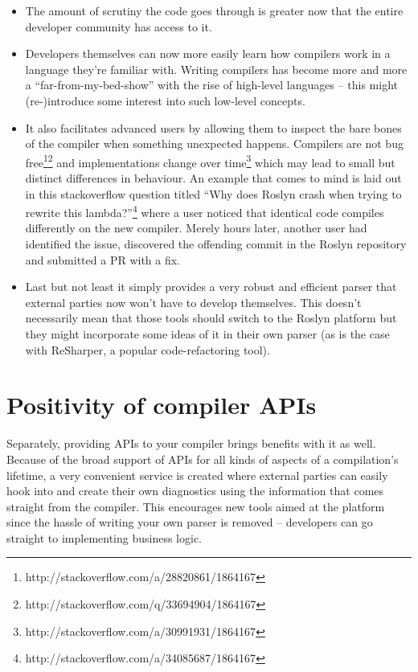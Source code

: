 \begin{itemize}
	\item The amount of scrutiny the code goes through is greater now that the entire developer community has access to it.
	
	\item Developers themselves can now more easily learn how compilers work in a language they’re familiar with. Writing compilers has become more and more a “far-from-my-bed-show” with the rise of high-level languages – this might (re-)introduce some interest into such low-level concepts.
	
	\item It also facilitates advanced users by allowing them to inspect the bare bones of the compiler when something unexpected happens. Compilers are not bug free\footnote{http://stackoverflow.com/a/28820861/1864167}\footnote{http://stackoverflow.com/q/33694904/1864167} and implementations change over time\footnote{http://stackoverflow.com/a/30991931/1864167} which may lead to small but distinct differences in behaviour. An example that comes to mind is laid out in this stackoverflow question titled “Why does Roslyn crash when trying to rewrite this lambda?”\footnote{http://stackoverflow.com/a/34085687/1864167} where a user noticed that identical code compiles differently on the new compiler. Merely hours later, another user had identified the issue, discovered the offending commit in the Roslyn repository and submitted a PR with a fix.
	
	\item Last but not least it simply provides a very robust and efficient parser that external parties now won’t have to develop themselves. This doesn’t necessarily mean that those tools should switch to the Roslyn platform but they might incorporate some ideas of it in their own parser (as is the case with ReSharper, a popular code-refactoring tool).\parencite{Gorohovsky2014}

\end{itemize}


\section{Positivity of compiler APIs}
\label{sec:intro-pos-api}

Separately, providing APIs to your compiler brings benefits with it as well. Because of the broad support of APIs for all kinds of aspects of a compilation’s lifetime, a very convenient service is created where external parties can easily hook into and create their own diagnostics using the information that comes straight from the compiler. This encourages new tools aimed at the platform since the hassle of writing your own parser is removed – developers can go straight to implementing business logic. 

